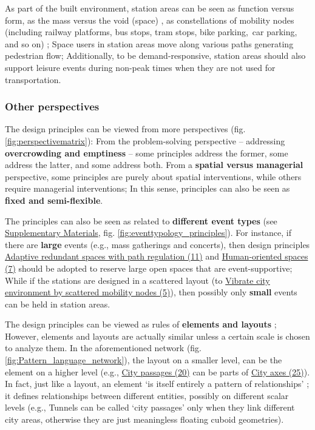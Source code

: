 \documentclass[]{article}
\begin{document}
As part of the built environment, station areas can be seen as function versus form, as the mass versus the void (space) \citep{rossiArchitectureCity1982, trancikFindingLostSpace1986},  as constellations of mobility nodes (including railway platforms, bus stops, tram stops, bike parking, car parking, and so on) \citep{vanderspekConnectorsWayTransferring2003}; Space users in station areas move along various paths generating pedestrian flow; Additionally, to be demand-responsive, station areas should also support leisure events during non-peak times when they are not used for transportation. 

\subsubsection{Other perspectives}
The design principles can be viewed from more perspectives (fig. \ref{fig:perspectivematrix}): From the problem-solving perspective -- addressing \textbf{overcrowding and emptiness} -- some principles address the former, some address the latter, and some address both. From a \textbf{spatial versus managerial} perspective, some principles are purely about spatial interventions, while others require managerial interventions; In this sense, principles can also be seen as \textbf{fixed and semi-flexible}.  



The principles can also be seen as related to \textbf{different event types} (see \href{https://github.com/1309928130/Paper3_SupplementaryMaterials/blob/main/SupplementaryMaterials.pdf}{Supplementary Materials}, fig. \ref{fig:eventtypology_principles}). For instance, if there are \textbf{large} events (e.g., mass gatherings and concerts), then design principles \hyperref[(11) Adaptive redundant spaces with path regulation]{Adaptive redundant spaces with path regulation (11)} and \hyperref[(7) Human-oriented spaces]{Human-oriented spaces (7)} should be adopted to reserve large open spaces that are event-supportive; While if the stations are designed in a scattered layout (to \hyperref[(P4 P5) Vibrate city environment or increase accommodating capacity by scattered mobility nodes]{Vibrate city environment by scattered mobility nodes (5)}), then possibly only \textbf{small} events can be held in station areas. 



The design principles can be viewed as rules of \textbf{elements and layouts} \citep{liuMappingLandscapeSpaces2020}; However, elements and layouts are actually similar unless a certain scale is chosen to analyze them. In the aforementioned network (fig. \ref{fig:Pattern_language_network}), the layout on a smaller level, can be the element on a higher level (e.g., \hyperref[(20 21) City passages and their positioning]{City passages (20)} can be parts of \hyperref[(25) City axes]{City axes (25)}). In fact, just like a layout, an element `is itself entirely a pattern of relationships' \citep[p. 89]{alexanderTimelessWayBuilding1979}; it defines relationships between different entities, possibly on different scalar levels (e.g., Tunnels can be called `city passages' only when they link different city areas, otherwise they are just meaningless floating cuboid geometries).
\end{document}
